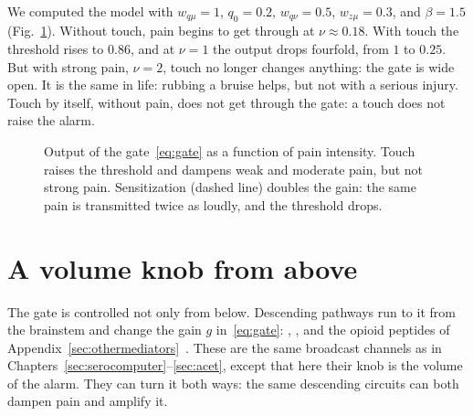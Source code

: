 We computed the model with $w_{q\mu}=1$, $q_0=0.2$, $w_{q\nu}=0.5$, $w_{z\mu}=0.3$, and $\beta=1.5$ (Fig.~\ref{fig:gatecurves}). Without touch, pain begins to get through at $\nu\approx0.18$. With touch the threshold rises to $0.86$, and at $\nu=1$ the output drops fourfold, from $1$ to $0.25$. But with strong pain, $\nu=2$, touch no longer changes anything: the gate is wide open. It is the same in life: rubbing a bruise helps, but not with a serious injury. Touch by itself, without pain, does not get through the gate: a touch does not raise the alarm.

\begin{figure}[t]
\centering
{}
\caption{Output of the gate~\eqref{eq:gate} as a function of pain intensity. Touch raises the threshold and dampens weak and moderate pain, but not strong pain. Sensitization (dashed line) doubles the gain: the same pain is transmitted twice as loudly, and the threshold drops.}
\label{fig:gatecurves}
\end{figure}

\section{A volume knob from above}

The gate is controlled not only from below. Descending pathways run to it from the brainstem and change the gain $g$ in~\eqref{eq:gate}: , , and the opioid peptides of Appendix~\ref{sec:othermediators}~\cite{Fields2004}. These are the same broadcast channels as in Chapters~\ref{sec:serocomputer}--\ref{sec:acet}, except that here their knob is the volume of the alarm. They can turn it both ways: the same descending circuits can both dampen pain and amplify it.


